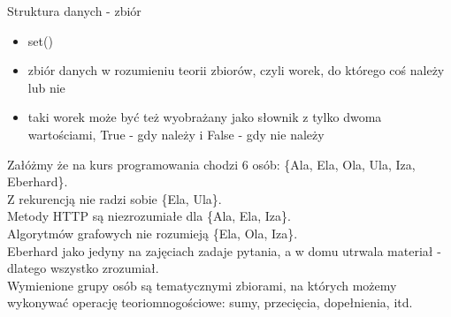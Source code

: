 \begin{frame}{Struktura danych - zbiór}
    \begin{itemize}
        \item set() \\
        \item zbiór danych w rozumieniu teorii zbiorów, czyli worek, do którego coś należy lub nie \\
        \item taki worek może być też wyobrażany jako słownik z tylko dwoma wartościami, True - gdy należy
        i False - gdy nie należy
    \end{itemize}
    Załóżmy że na kurs programowania chodzi 6 osób: \{Ala, Ela, Ola, Ula, Iza, Eberhard\}. \\
    Z rekurencją nie radzi sobie \{Ela, Ula\}. \\
    Metody HTTP są niezrozumiałe dla \{Ala, Ela, Iza\}. \\
    Algorytmów grafowych nie rozumieją \{Ela, Ola, Iza\}. \\
    Eberhard jako jedyny na zajęciach zadaje pytania, a w domu utrwala materiał - dlatego wszystko zrozumiał. \\
    Wymienione grupy osób są tematycznymi zbiorami, na których możemy wykonywać operację teoriomnogościowe:
    sumy, przecięcia, dopełnienia, itd.
\end{frame}

